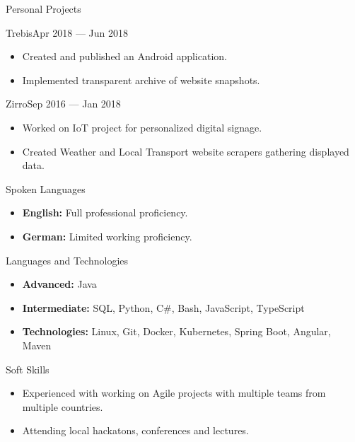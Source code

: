 \documentclass[]{style}
\begin{document}
	\begin{cvsection}{Personal Projects}
	    \begin{cvsubsection}{Trebis}{}{Apr 2018 — Jun 2018}
			\begin{itemize}
				\item Created and published an Android application.
				\item Implemented transparent archive of website snapshots.
			\end{itemize}
		\end{cvsubsection}
		
		\begin{cvsubsection}{Zirro}{}{Sep 2016 — Jan 2018}
			\begin{itemize}
			    \item Worked on IoT project for personalized digital signage.
				\item Created Weather and Local Transport website scrapers gathering displayed data.
			\end{itemize}
		\end{cvsubsection}
	\end{cvsection}
	
	\begin{cvsection}{Spoken Languages}
		\begin{cvsubsection}{}{}{}	
			\begin{itemize}
                \item \textbf{English:} Full professional proficiency.
                \item \textbf{German:} Limited working proficiency.
			\end{itemize}
		\end{cvsubsection}
	\end{cvsection}
	
	\begin{cvsection}{Languages and Technologies}
		\begin{cvsubsection}{}{}{}
			\begin{itemize}
				\item \textbf{Advanced:} Java \item \textbf{Intermediate:} SQL, Python, C\#, Bash, JavaScript, TypeScript
				\item \textbf{Technologies:} Linux, Git, Docker, Kubernetes, Spring Boot, Angular, Maven
			\end{itemize}
		\end{cvsubsection}
	\end{cvsection}
	
	\begin{cvsection}{Soft Skills}
		\begin{cvsubsection}{}{}{}	
			\begin{itemize}
                \item Experienced with working on Agile projects with multiple teams from multiple countries.
                \item Attending local hackatons, conferences and lectures.
			\end{itemize}
		\end{cvsubsection}
	\end{cvsection}
	
	
\end{document}
